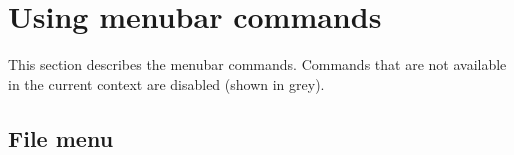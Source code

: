\begin{comment}
To reload the document, click on {\bf File | Open...} or the \image{}{open.gif} toolbar button.
If you are working on another document, you will be prompted to save it first.

Go to \helpref{Step 5: generating configurations}{step5}

\section{Step 5: generating configurations}\label{step5}

Todo.

Go to \helpref{Step 6: where next?}{step6}

\section{Step 6: where next?}\label{step6}

Congratulations! You have learnt how to create, edit, save, and load configuration
files.

To get to know \ctshortname more thoroughly, here are some further things you
can do.

\begin{itemize}
\item Read the \helpref{How To}{howto} section.
\item Use the help facilities: most dialogs have a {\bf Help} button for a general description, and they
also have a {\bf "?"} button for getting information on individual controls on a dialog.
\item Explore the menubar and the menus that appear when you right-click over
the window background and individual cards.
\end{itemize}

\end{comment}

\chapter{Using menubar commands}\label{menubarcommands}%
%
\setfooter{\thepage}{}{}{}{}{\thepage}%


This section describes the menubar commands. Commands
that are not available in the current context are disabled (shown in grey).

\section{File menu}

